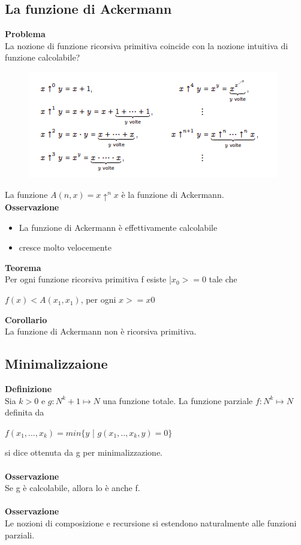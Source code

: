 \subsection{La funzione di Ackermann}
\textbf{Problema}\\
La nozione di funzione ricorsiva primitiva coincide con la nozione intuitiva di funzione calcolabile?
\begin{figure}[htp]
    \includegraphics[scale=0.9]{tesi_stile/img/f2cap8.png}
\end{figure}
La funzione $A(n, x) = x \uparrow^n x$ è la funzione di Ackermann.\\
\textbf{Osservazione}\\
\begin{itemize}
    \item La funzione di Ackermann è effettivamente calcolabile
    
    \item cresce molto velocemente
\end{itemize}
\textbf{Teorema}\\
Per ogni funzione ricorsiva primitiva f esiste |$x_0 >= 0$ tale che
\begin{center}
    $f (x) < A(x_1, x_1)$, per ogni $x >= x0$
\end{center}
\textbf{Corollario}\\
La funzione di Ackermann non è ricorsiva primitiva.
\newpage
\subsection{Minimalizzaione}
\textbf{Definizione}\\
Sia $k > 0$ e $g: N^k+1 \mapsto N$ una funzione totale. La funzione parziale $f:N^k \mapsto N$ definita da
\begin{center}
    $f(x_1, ... , x_k ) = min\{y$ | $g(x_1, .. , x_k, y) = 0\}$
\end{center}
si dice ottenuta da g per minimalizzazione.\\\\
\textbf{Osservazione}\\
Se g è calcolabile, allora lo è anche f.\\\\
\textbf{Osservazione}\\
Le nozioni di composizione e recursione si estendono naturalmente alle funzioni parziali.
